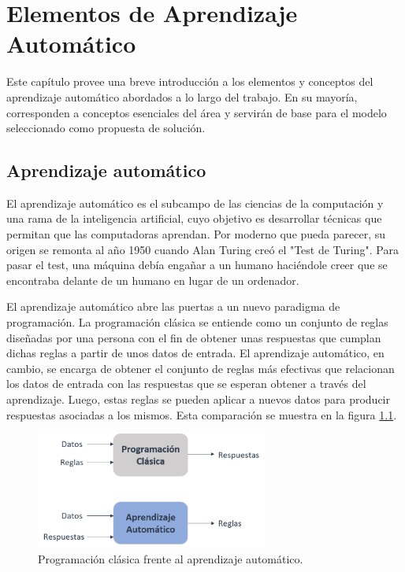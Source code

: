 \chapter{Elementos de Aprendizaje Automático}\label{chapter:MLIntro}

Este capítulo provee una breve introducción a los elementos y conceptos del aprendizaje automático abordados a lo largo del trabajo. En su mayoría, corresponden a conceptos esenciales del área y servirán de base para el modelo seleccionado como propuesta de solución. 

\section{Aprendizaje automático}

El aprendizaje automático es el subcampo de las ciencias de la computación y una rama de la inteligencia artificial, cuyo objetivo es desarrollar técnicas que permitan que las computadoras aprendan. Por moderno que pueda parecer, su origen se remonta al año 1950 cuando Alan Turing creó el "Test de Turing". Para pasar el test, una máquina debía engañar a un humano haciéndole creer que se encontraba delante de un humano en lugar de un ordenador.

El aprendizaje automático abre las puertas a un nuevo paradigma de programación. La programación clásica se entiende como un conjunto de reglas diseñadas por una persona con el fin de obtener unas respuestas que cumplan dichas reglas a partir de unos datos de entrada. El aprendizaje automático, en cambio, se encarga de obtener el conjunto de reglas más efectivas que relacionan los datos de entrada con las respuestas que se esperan obtener a través del aprendizaje. Luego, estas reglas se pueden aplicar a nuevos datos para producir respuestas asociadas a los mismos. Esta comparación se muestra en la figura \ref{PCvsML}.

\begin{figure}[!h]
	\centering
	
	\includegraphics[width=3in]{Graphics/PCvsML.png}
	
	\caption{ \small{Programación clásica frente al aprendizaje automático.}}
	
	\label{PCvsML}
	
\end{figure}



